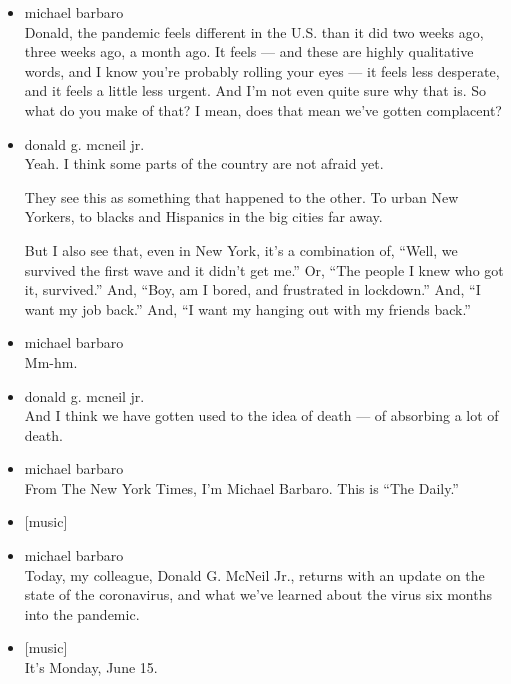 \begin{itemize}
\item
  michael barbaro\\
  Donald, the pandemic feels different in the U.S. than it did two weeks
  ago, three weeks ago, a month ago. It feels --- and these are highly
  qualitative words, and I know you're probably rolling your eyes --- it
  feels less desperate, and it feels a little less urgent. And I'm not
  even quite sure why that is. So what do you make of that? I mean, does
  that mean we've gotten complacent?
\item
  donald g. mcneil jr.\\
  Yeah. I think some parts of the country are not afraid yet.

  They see this as something that happened to the other. To urban New
  Yorkers, to blacks and Hispanics in the big cities far away.

  But I also see that, even in New York, it's a combination of, ``Well,
  we survived the first wave and it didn't get me.'' Or, ``The people I
  knew who got it, survived.'' And, ``Boy, am I bored, and frustrated in
  lockdown.'' And, ``I want my job back.'' And, ``I want my hanging out
  with my friends back.''
\item
  michael barbaro\\
  Mm-hm.
\item
  donald g. mcneil jr.\\
  And I think we have gotten used to the idea of death --- of absorbing
  a lot of death.
\item
  michael barbaro\\
  From The New York Times, I'm Michael Barbaro. This is ``The Daily.''
\item
  {[}music{]}
\item
  michael barbaro\\
  Today, my colleague, Donald G. McNeil Jr., returns with an update on
  the state of the coronavirus, and what we've learned about the virus
  six months into the pandemic.
\item
  {[}music{]}\\
  It's Monday, June 15.


\end{itemize}
